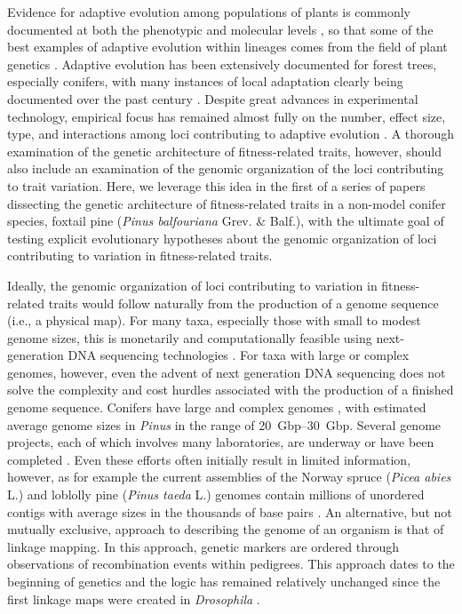 \documentclass[11pt]{article}
\begin{document}
Evidence for adaptive evolution among populations of plants is commonly documented at both the phenotypic 
and molecular levels \citep{Kawecki:2004, Pannell:2013}, so that some of the best
examples of adaptive evolution within lineages comes from the field of plant genetics \citep[e.g.,][]{Antonovics:1970}.
Adaptive evolution has been extensively documented for forest trees, especially conifers, with many instances of 
local adaptation clearly being documented over the past century \citep{White:2007, Neale:2011}. Despite great advances 
in experimental technology, empirical focus has remained almost fully on the number, effect size, type, and interactions 
among loci contributing to adaptive evolution \citep{Neale:2011, Alberto:2013}.  A thorough examination of the 
genetic architecture of fitness-related traits, however, should also include 
an examination of the genomic organization of the loci contributing to trait variation. Here, we leverage 
this idea in the first of a series of papers dissecting the genetic architecture of fitness-related 
traits in a non-model conifer species, foxtail pine (\textit{Pinus balfouriana} Grev. \& Balf.), with the 
ultimate goal of testing explicit evolutionary hypotheses about the genomic organization of loci 
contributing to variation in fitness-related traits.

Ideally, the genomic organization of loci contributing to variation in fitness-related traits would follow 
naturally from the production of a genome sequence (i.e., a physical map). For many taxa, especially those with 
small to modest genome sizes, this is monetarily and computationally feasible using next-generation DNA sequencing 
technologies \citep{Koboldt:2013}. For taxa with large or complex genomes, however, even the advent of next generation DNA 
sequencing does not solve the complexity and cost hurdles associated with the production of a finished genome sequence. Conifers 
have large and complex genomes \citep{Murray:1998, Ahuja:2005}, with estimated average genome sizes in \textit{Pinus} in the 
range of \SIrange{20}{30}{Gbp}. Several genome projects, each of which involves many laboratories, are underway or have been 
completed \citep{Mackay:2012}. Even these efforts often initially result in limited information, however,
as for example the current assemblies of the Norway spruce (\textit{Picea abies} L.) and loblolly pine (\textit{Pinus taeda} L.) genomes 
contain millions of unordered contigs with average sizes in the thousands of base pairs \citep{Nystedt:2013}. An alternative, 
but not mutually exclusive, approach to describing the genome of an organism 
is that of linkage mapping. In this approach, genetic markers are ordered through observations of recombination events 
within pedigrees. This approach dates to the beginning of genetics and the logic has remained relatively unchanged 
since the first linkage maps were created in \textit{Drosophila} \citep{Sturtevant:1913}.
\end{document}
